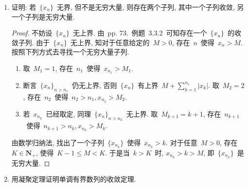 \documentclass[UTF8,a4paper,11pt,twoside]{book}
\begin{document}
\begin{enumerate}
\begin{proof}
		      必要性. 若有界数列~$\{x_n\}$~发散. 由~Weierstrass~定理, 存在一个收敛子列~$\{x_{n_l}\}$, 记其极限为~$A$. 由于~$\{x_n\}$~不收敛于~$A$, 故存在~$\varepsilon_0>0$, 对于任意~$N>0$, 存在~$n>N$~使得~$|x_n-A|\geqslant\varepsilon$.

		      对于~$N_1=1$, 存在~$k_1>N_1$~使得~$|x_{k_1}-A|\geqslant\varepsilon_0$;

		      对于~$N_2=k_1$, 存在~$k_2>N_2$~使得~$|x_{k_2}-A|\geqslant\varepsilon_0$;

		      若~$x_{k_n}$~已经取定, 对于~$N_{n+1}=k_n$, 存在~$k_{n+1}>N_{k+1}$~使得~$|x_{k_{n+1}}-A|\geqslant\varepsilon_0$.

		      由数学归纳法, 找出了一个有界数列~$\{x_n\}$~的子列~$\{x_{k_n}\}$, 因而仍是有界数列, 由~Weierstrass~定理, 存在一个收敛子列, 记为~$\{x_{n_m}\}$. 注意对于~$\forall m\in\mathbf{N}_{+}$, $|x_{n_m}-A|\geqslant\varepsilon_0$, 故~$\lim\limits_{m\to\infty} x_{n_m}\neq A$. 从而~$\{x_{n_l}\}$~和~$\{x_{n_m}\}$~是~$\{x_n\}$~的收敛于不同极限的两个子列. \qedhere
	      \end{proof}

	\item 证明: 若~$\{x_n\}$~无界, 但不是无穷大量, 则存在两个子列, 其中一个子列收敛, 另一个子列是无穷大量.
	      \begin{proof}
		      不妨设~$\{x_n\}$~无上界. 由~pp. 73.~例题~3.3.2~可知存在一个~$\{x_n\}$~的收敛子列.
		      由于~$\{x_n\}$~无上界, 知对于任意给定的~$M>0$, 存在~$n$~使得~$x_n>M$. 按照下列方式去寻找一个无穷大量子列.
		      \begin{enumerate}[(1)]
			      \item 取~$M_1=1$, 存在~$n_1$~使得~$x_{n_1}>M_1$.
			      \item 断言~$\{x_n\}_{n>n_1}$~仍无上界, 否则~$\{x_n\}$~有上界~$M+\sum\limits_{k=1}^{n_1} |x_k|$. 取~$M_2=2$, 存在~$n_2$~使得~$n_2>n_1, x_{n_2}>M_2$.
			      \item 若~$x_{n_k}$~已经取定, 同理~$\{x_n\}_{n>n_k}$~无上界. 取~$M_{k+1}=k+1$, 存在~$n_{k+1}$~使得~$n_{k+1}>n_k, x_{n_k}>M_k$.
		      \end{enumerate}
		      由数学归纳法, 找出了一个子列~$\{x_{n_k}\}$~使得~$x_{n_k}>k$. 对于任意~$M>0$, 存在~$K\in\mathbf{N}_{+}$, 使得~$K-1\leqslant M<K$. 于是当~$k>K$~时, $x_{n_k}>k>M$, 即~$\{x_{n_k}\}$~是无穷大量. \qedhere
	      \end{proof}

	\item 用凝聚定理证明单调有界数列的收敛定理.
\end{enumerate}
\end{document}
